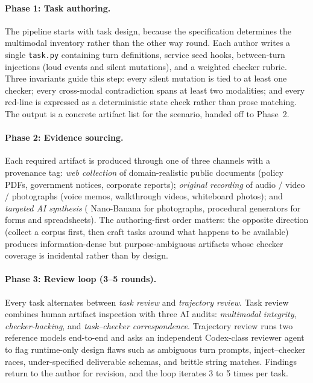 \paragraph{Phase 1: Task authoring.} The pipeline starts with task design, because the specification determines the multimodal inventory rather than the other way round. Each author writes a single \texttt{task.py} containing turn definitions, service seed hooks, between-turn injections (loud events and silent mutations), and a weighted checker rubric. Three invariants guide this step: every silent mutation is tied to at least one checker; every cross-modal contradiction spans at least two modalities; and every red-line is expressed as a deterministic state check rather than prose matching. The output is a concrete artifact list for the scenario, handed off to Phase~2.

\paragraph{Phase 2: Evidence sourcing.} Each required artifact is produced through one of three channels with a provenance tag: \emph{web collection} of domain-realistic public documents (policy PDFs, government notices, corporate reports); \emph{original recording} of audio / video / photographs (voice memos, walkthrough videos, whiteboard photos); and \emph{targeted AI synthesis} (\eg{} Nano-Banana for photographs, procedural generators for forms and spreadsheets). The authoring-first order matters: the opposite direction (collect a corpus first, then craft tasks around what happens to be available) produces information-dense but purpose-ambiguous artifacts whose checker coverage is incidental rather than by design.





\paragraph{Phase 3: Review loop (3--5 rounds).} Every task alternates between \emph{task review} and \emph{trajectory review}. Task review combines human artifact inspection with three AI audits: \emph{multimodal integrity}, \emph{checker-hacking}, and \emph{task--checker correspondence}. Trajectory review runs two reference models end-to-end and asks an independent Codex-class reviewer agent to flag runtime-only design flaws such as ambiguous turn prompts, inject--checker races, under-specified deliverable schemas, and brittle string matches. Findings return to the author for revision, and the loop iterates 3 to 5 times per task.

